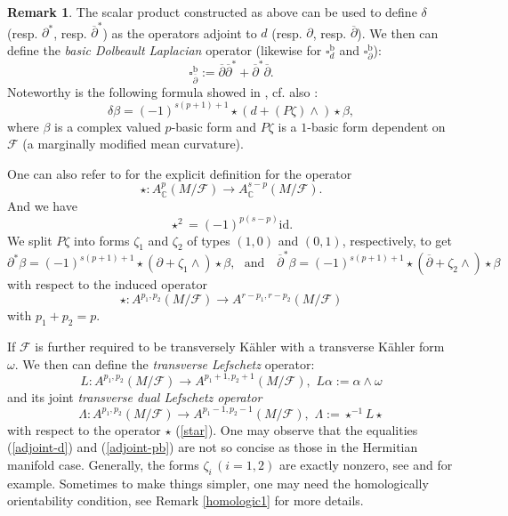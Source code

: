 \documentclass[12pt]{amsart}
\numberwithin{equation}{section}
\theoremstyle{definition}
\theoremstyle{definition}
\theoremstyle{definition}
\newtheorem{remark}  [theorem]     {Remark}
\renewcommand{\1}{\mathsf{1}}
\renewcommand{\>}{\rightarrow}
\newcommand{\p}{\partial}
\newcommand{\bp}{\overline\partial}
\def\p{\partial}
\def\mb{\mathbb}
\def\mc{\mathcal}
\theoremstyle{plain} %
\theoremstyle{plain} %
\theoremstyle{plain} %
\begin{document}
	\begin{remark}\label{ADJOINT}
		The scalar product constructed as above can be used to define $\delta$ (resp. $\p^*$, resp. ${\bp}^*$) as the operators adjoint to $d$ (resp. $\p$, resp. $\bp$). We then can define the \textit{basic Dolbeault Laplacian} operator (likewise for $\square^\mathrm b_ d$ and $\square^\mathrm b_{\p}$):
		$$\square_{\bp}^\mathrm b:=\bp{\bp}^*+{\bp}^*\bp.$$
		Noteworthy is the following formula showed in
		\cite[Proposition 2.2]{ER96}, cf. also \cite{AL92}:
		\begin{equation*}\label{adjoint-d}
			\delta\beta=(-1)^{s(p+1)+1} {\star} (d +(P \zeta)\wedge)\star \beta,
		\end{equation*}
		where $\beta$ is a complex valued $p$-basic form and $P\zeta$ is a $1$-basic form dependent on $\mc F$ (a marginally modified mean curvature). 
        
        One  can also refer to \cite[line 10 in p. 1262]{ER96} for the explicit definition for the operator $$\star: A^p_\mb C(M/\mc F)\rightarrow A^{s-p}_\mb C(M/\mc F).$$
		And we have
		\begin{equation*}\label{2id}
			\star^2={(-1)}^{p(s-p)}\text{id}.
		\end{equation*}
		We split $P\zeta$ into forms $\zeta_1$ and $\zeta_2$ of types $(1,0)$ and $(0,1)$, respectively, to get
		\begin{equation}\label{adjoint-pb}
			{\p}^*\beta=(-1)^{s(p+1)+1} {\star} (\p+\zeta_1\wedge)\star \beta,\,\,\,\,\text{and}\,\,\,\,\,\,{\bp}^*\beta=(-1)^{s(p+1)+1} {\star} (\bp+\zeta_2\wedge)\star\beta
		\end{equation}
		with respect to the induced operator \begin{equation}\label{star}
			\star: A^{p_1,p_2}(M/\mc F)\rightarrow A^{r-p_1,r-p_2}(M/\mc F)
		\end{equation}
		with $p_1+p_2=p$.
		
		If $\mc F$ is further required to be  transversely K\"ahler with a transverse K\"ahler form $\omega$. We then can define the \textit{transverse Lefschetz} operator:
		$$L:A^{p_1,p_2}(M/\mc F)\rightarrow A^{p_1+1,p_2+1}(M/\mc F),\,\,L\alpha:=\alpha\wedge\omega$$
		and its joint \textit{transverse dual Lefschetz operator}
		$$\Lambda: A^{p_1,p_2}(M/\mc F)\rightarrow A^{p_1-1,p_2-1}(M/\mc F),\,\,
		\Lambda:=\star^{-1}L\star$$
		with respect to the operator $\star$ (\ref{star}).
		One may observe that the equalities (\ref{adjoint-d}) and (\ref{adjoint-pb})  are not so concise as those in the Hermitian manifold case. Generally, the forms $\zeta_i\,  (i=1,2)$ are exactly nonzero, see \cite{Car84} and \cite[Example 2.3 in Appendix B]{Mo88} for example. Sometimes to make things simpler, one may need the  homologically orientability condition, see Remark \ref{homologic1} for more details.
		
	\end{remark}
	
\end{document}
